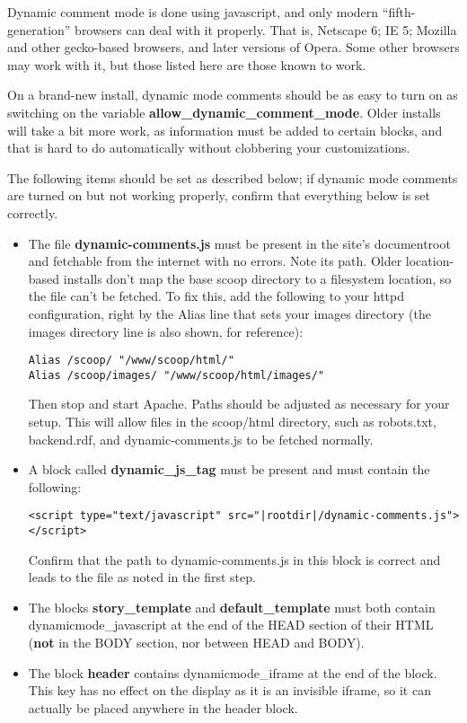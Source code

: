 Dynamic comment mode is done using javascript, and only modern ``fifth-generation'' browsers can deal with it properly.  That is, Netscape \latexhtml{$>$}{>} 6; IE \latexhtml{$>$}{>} 5; Mozilla and other gecko-based browsers, and later versions of Opera. Some other browsers may work with it, but those listed here are those known to work.

On a brand-new install, dynamic mode comments should be as easy to turn on as switching on the variable {\bf allow\_dynamic\_comment\_mode}.  Older installs will take a bit more work, as information must be added to certain blocks, and that is hard to do automatically without clobbering your customizations.

The following items should be set as described below; if dynamic mode comments are turned on but not working properly, confirm that everything below is set correctly.

\begin{itemize}
\item The file {\bf dynamic-comments.js} must be present in the site's documentroot and fetchable from the internet with no errors.  Note its path.  Older location-based installs don't map the base scoop directory to a filesystem location, so the file can't be fetched.  To fix this, add the following to your httpd configuration, right by the Alias line that sets your images directory (the images directory line is also shown, for reference):
\begin{verbatim}
Alias /scoop/ "/www/scoop/html/"
Alias /scoop/images/ "/www/scoop/html/images/"
\end{verbatim}
Then stop and start Apache.  Paths should be adjusted as necessary for your setup.  This will allow files in the scoop/html directory, such as robots.txt, backend.rdf, and dynamic-comments.js to be fetched normally.
\item A block called {\bf dynamic\_js\_tag} must be present and must contain the following:
\begin{verbatim}
<script type="text/javascript" src="|rootdir|/dynamic-comments.js"></script>
\end{verbatim}
Confirm that the path to dynamic-comments.js in this block is correct and leads to the file as noted in the first step.
\item The blocks {\bf story\_template} and {\bf default\_template} must both contain \latexhtml{$\vert$}{|}dynamicmode\_javascript\latexhtml{$\vert$}{|} at the end of the HEAD section of their HTML ({\bf not} in the BODY section, nor between HEAD and BODY).
\item The block {\bf header} contains \latexhtml{$\vert$}{|}dynamicmode\_iframe\latexhtml{$\vert$}{|} at the end of the block.  This key has no effect on the display as it is an invisible iframe, so it can actually be placed anywhere in the header block.
\end{itemize}


